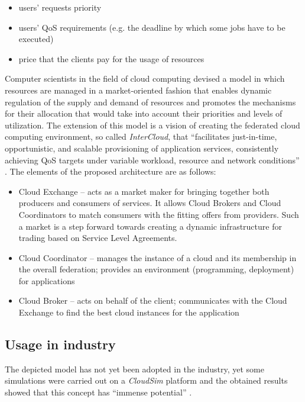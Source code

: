 \begin{itemize}
  \item users' requests priority
  \item users' QoS requirements (e.g. the deadline by which some jobs have to be executed)
  \item price that the clients pay for the usage of resources
\end{itemize}

Computer scientists in the field of cloud computing devised a model \cite{MarketOrientedCC08} in which resources are managed in a market-oriented fashion that enables dynamic regulation of the supply and demand of resources and promotes the mechanisms for their allocation that would take into account their priorities and levels of utilization.
The extension of this model is a vision of creating the federated cloud computing environment, so called \emph{InterCloud}, that ``facilitates just-in-time, opportunistic, and scalable provisioning of application services, consistently achieving QoS targets under variable workload, resource and network conditions'' \cite{InterCloud10}.
The elements of the proposed architecture are as follows:
\begin{itemize}
  \item Cloud Exchange -- acts as a market maker for bringing together both producers and consumers of services. It allows Cloud Brokers and Cloud Coordinators to match consumers with the fitting offers from providers. Such a market is a step forward towards creating a dynamic infrastructure for trading based on Service Level Agreements.
  \item Cloud Coordinator -- manages the instance of a cloud and its membership in the overall federation; provides an environment (programming, deployment) for applications
  \item Cloud Broker -- acts on behalf of the client; communicates with the Cloud Exchange to find the best cloud instances for the application
\end{itemize}

\subsection{Usage in industry}
The depicted model has not yet been adopted in the industry, yet some simulations were carried out on a \emph{CloudSim} platform and the obtained results showed that this concept has ``immense potential'' \cite{InterCloud10}.

